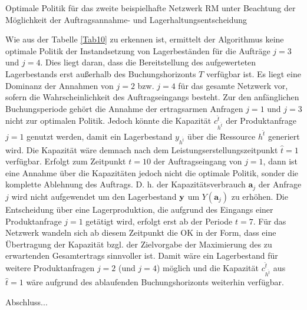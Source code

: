 \begin{table}
\begin{footnotesize}
     \caption{Optimale Politik für das zweite beispielhafte Netzwerk RM unter Beachtung der Möglichkeit der Auftragsannahme- und Lagerhaltungsentscheidung} \label{Tab10}
    \vspace*{3mm}
        \begin{center}
      \end{center}
    \begin{center}
      \end{center}
\end{footnotesize}
\end{table}

Wie aus der Tabelle \ref{Tab10} zu erkennen ist, ermittelt der Algorithmus keine optimale Politik der Instandsetzung von Lagerbeständen für die Aufträge $j=3$ und $j=4$. Dies liegt daran, dass die Bereitstellung des aufgewerteten Lagerbestands erst außerhalb des Buchungshorizonts $T$ verfügbar ist. Es liegt eine Dominanz der Annahmen von $j=2$ bzw. $j=4$ für das gesamte Netzwerk vor, sofern die Wahrscheinlichkeit des Auftragseingangs besteht. Zur den anfänglichen Buchungsperiode gehört die Annahme der ertragsarmen Anfragen $j=1$ und $j=3$ nicht zur optimalen Politik. Jedoch könnte die Kapazität $c_{h^{\hat t}}^{\hat t}$ der Produktanfrage $j=1$ genutzt werden, damit ein Lagerbestand $y_{h^{\hat t}}$ über die Ressource $h^{\hat t}$ generiert wird. Die Kapazität wäre demnach nach dem Leistungserstellungszeitpunkt $\hat{t}=1$ verfügbar. Erfolgt zum Zeitpunkt $t=10$ der Auftragseingang von $j=1$, dann ist eine Annahme über die Kapazitäten jedoch nicht die optimale Politik, sonder die komplette Ablehnung des Auftrags. D. h. der Kapazitätsverbrauch $\textbf{a}_j$ der Anfrage $j$ wird nicht aufgewendet um den Lagerbestand $\textbf y$ um $Y(\textbf{a}_j)$ zu erhöhen. Die Entscheidung über eine Lagerproduktion, die aufgrund des Eingangs einer Produktanfrage $j=1$ getätigt wird, erfolgt erst ab der Periode $t=7$. Für das Netzwerk wandeln sich ab diesem Zeitpunkt die OK in der Form, dass eine Übertragung der Kapazität bzgl. der Zielvorgabe der Maximierung des zu erwartenden Gesamtertrags sinnvoller ist. Damit wäre ein Lagerbestand für weitere Produktanfragen $j=2$ (und $j=4$) möglich und die Kapazität $c_{h^{\hat t}}^{\hat t}$ aus $\hat{t}=1$ wäre aufgrund des ablaufenden Buchungshorizonts weiterhin verfügbar. 

Abschluss...



